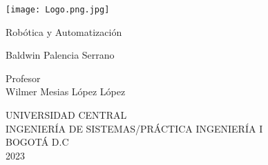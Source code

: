\documentclass[12pt, Letterpaper]{article}
\begin{document}
 
\begin{center}

\texttt{[image: Logo.png.jpg]}\\[1cm]
\vspace{1.2cm}

{\LARGE Robótica y Automatización}\\
 

\vspace{2,5cm}

{\Large Baldwin Palencia Serrano}\\

\vspace{2cm}

{\Large Profesor\\Wilmer Mesias López López}
\vspace{2.5cm}

{\large UNIVERSIDAD CENTRAL\\ 
INGENIERÍA DE SISTEMAS/PRÁCTICA INGENIERÍA I\\
BOGOTÁ D.C\\ 
2023}

\vspace{1.7cm}

\end{center}
\end{document}
